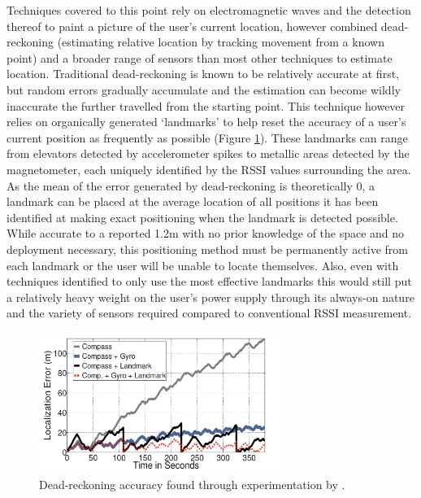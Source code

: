 \documentclass{UoYCSproject}
\begin{document}
                Techniques covered to this point rely on electromagnetic waves and the detection thereof to paint a picture of the user's current location, however \citet{wang2012no} combined dead-reckoning (estimating relative location by tracking movement from a known point) and a broader range of sensors than most other techniques to estimate location. Traditional dead-reckoning is known to be relatively accurate at first, but random errors gradually accumulate and the estimation can become wildly inaccurate the further travelled from the starting point. This technique however relies on organically generated `landmarks' to help reset the accuracy of a user's current position as frequently as possible (Figure \ref{fig:dead}). These landmarks can range from elevators detected by accelerometer spikes to metallic areas detected by the magnetometer, each uniquely identified by the RSSI values surrounding the area. As the mean of the error generated by dead-reckoning is theoretically $0$, a landmark can be placed at the average location of all positions it has been identified at making exact positioning when the landmark is detected possible. While accurate to a reported 1.2m with no prior knowledge of the space and no deployment necessary, this positioning method must be permanently active from each landmark or the user will be unable to locate themselves. Also, even with techniques identified to only use the most effective landmarks this would still put a relatively heavy weight on the user's power supply through its always-on nature and the variety of sensors required compared to conventional RSSI measurement.
                
                \begin{figure}[h]
                    \label{fig:dead}
                    \caption{Dead-reckoning accuracy found through experimentation by \citet{wang2012no}.}
                    \centering
                        \includegraphics[width=0.7\textwidth]{dead.png}
                \end{figure}
                
\end{document}
